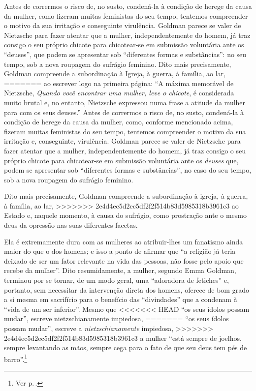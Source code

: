 Antes de corrermos o risco de, no susto,
condená-la à condição de herege da causa da mulher, como
fizeram muitas feministas do seu tempo, tentemos
compreender o motivo da sua irritação e conseguinte virulência.
Goldman parece se valer de Nietzsche para fazer atentar que a mulher,
independentemente do homem, já traz consigo o seu próprio chicote para
chicotear-se em submissão voluntária ante os ``deuses'', que podem se
apresentar sob ``diferentes formas e substâncias'': no seu
tempo, sob a nova roupagem do sufrágio feminino. Dito mais precisamente,
Goldman compreende a subordinação à Igreja, à guerra, à família, ao lar,
=======
ao escrever logo na primeira página: ``A máxima memorável de Nietzsche,
\textit{Quando você encontrar uma mulher, leve o chicote}, é considerada muito
brutal e, no entanto, Nietzsche expressou numa frase a atitude da mulher
para com os seus deuses.'' Antes de corrermos o risco de, no susto,
condená-la à condição de herege da causa da mulher, como, conforme
mencionado acima, fizeram muitas feministas do seu tempo, tentemos
compreender o motivo da sua irritação e, conseguinte, virulência.
Goldman parece se valer de Nietzsche para fazer atentar que a mulher,
independentemente do homem, já traz consigo o seu próprio chicote para
chicotear-se em submissão voluntária ante os \textit{deuses} que, podem se
apresentar sob ``diferentes formas e substâncias'', no caso do seu
tempo, sob a nova roupagem do sufrágio feminino. 

Dito mais precisamente,
Goldman compreende a subordinação à igreja, à guerra, à família, ao lar,
>>>>>>> 2e4d4ec5d2ec5df2f2f514b83d5985318b3961c3
ao Estado e, naquele momento, à causa do sufrágio, como prostração ante
o mesmo deus da opressão nas suas diferentes facetas.

Ela é extremamente
dura com as mulheres ao atribuir-lhes um fanatismo ainda maior do que o
dos homens; e isso a ponto de afirmar que ``a religião já teria deixado
de ser um fator relevante na vida das pessoas, não fosse pelo apoio que
recebe da mulher''. Dito resumidamente, a mulher, segundo Emma Goldman,
terminou por se tornar, de um modo geral, uma ``adoradora de fetiches''
e, portanto, sem necessitar da intervenção direta dos homens, oferece
de bom grado a si mesma em sacrifício para o benefício das
``divindades'' que a condenam à ``vida de um ser inferior''. Mesmo que
<<<<<<< HEAD
``os seus ídolos possam mudar'', escreve nietzschianamente impiedosa,
=======
``os seus ídolos possam mudar'', escreve a \textit{nietzschianamente} impiedosa,
>>>>>>> 2e4d4ec5d2ec5df2f2f514b83d5985318b3961c3
a mulher ``está sempre de joelhos, sempre levantando as mãos, sempre
cega para o fato de que seu deus tem pés de barro''.\footnote{Ver p.\,\pageref{barro}.}

